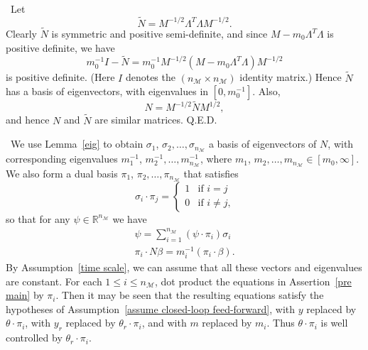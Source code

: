 \documentclass[reqno,twocolumn]{amsart}
\renewcommand{\mathsf}{}
\begin{document}
\bigskip{} \  Let
\begin{equation}
\tilde{\mathsf N} = \mathsf M^{-1/2} \mathsf \Lambda^T \mathsf \Lambda \mathsf M^{-1/2} .
\end{equation}
Clearly $\tilde{\mathsf N}$ is symmetric and positive semi-definite, and since $\mathsf M - m_0 \mathsf \Lambda^T \mathsf \Lambda$ is positive definite, we have
\begin{equation}
m_0^{-1} \mathsf I - \tilde{\mathsf N} = m_0^{-1} \mathsf M^{-1/2} (\mathsf M - m_0 \mathsf \Lambda^T \Lambda) \mathsf M^{-1/2}
\end{equation}
is positive definite.  (Here $\mathsf I$ denotes the $(n_{\mathcal M}\times n_{\mathcal M})$ identity matrix.)  Hence $\tilde{\mathsf N}$ has a basis of eigenvectors, with eigenvalues in $[0,m_0^{-1}]$.  Also,
\begin{equation}
\mathsf N = \mathsf M^{-1/2} \tilde{\mathsf N} \mathsf M^{1/2} ,
\end{equation}
and hence $\mathsf N$ and $\tilde{\mathsf N}$ are similar matrices.
\hfill Q.E.D.

\smallskip

\bigskip{} \  We use Lemma~\ref{eig} to obtain 
$\sigma_1$, $\sigma_2,\dots,\sigma_{n_{\mathcal M}}$ a basis of eigenvectors of $\mathsf N$, with corresponding eigenvalues
$m_1^{-1}$, $m_2^{-1}, \dots, m_{n_{\mathcal M}}^{-1}$, where $m_1$, $m_2, \dots, m_{n_{\mathcal M}} \in [m_0,\infty]$.  We also form a dual basis $\pi_1$, $\pi_2,\dots,\pi_{n_{\mathcal M}}$ that satisfies
\begin{equation}
\sigma_i \cdot \pi_j = \begin{cases} 1 & \text{if $i=j$} \\ 0 & \text{if $i \ne j$,}\end{cases}
\end{equation}
so that for any $\psi \in \mathbb R^{n_{\mathcal M}}$ we have
\begin{gather}
\label{mu nu}
\psi = \sum_{i=1}^{n_{\mathcal M}} (\psi \cdot \pi_i) \sigma_i \\
\pi_i \cdot \mathsf N \beta = m_i^{-1} (\pi_i \cdot \beta) .
\end{gather}
By Assumption~\ref{time scale}, we can assume that all these vectors and eigenvalues are constant.  For each $1 \le i \le n_{\mathcal M}$, dot product the equations in Assertion~\ref{pre main} by $\pi_i$.  Then it may be seen that the resulting equations satisfy the hypotheses of Assumption~\ref{assume closed-loop feed-forward}, with $y$ replaced by $\theta \cdot \pi_i$, with $y_r$ replaced by $\theta_r \cdot \pi_i$, and with $m$ replaced by $m_i$.  Thus $\theta \cdot \pi_i$ is well controlled by $\theta_r \cdot \pi_i$.
\end{document}
